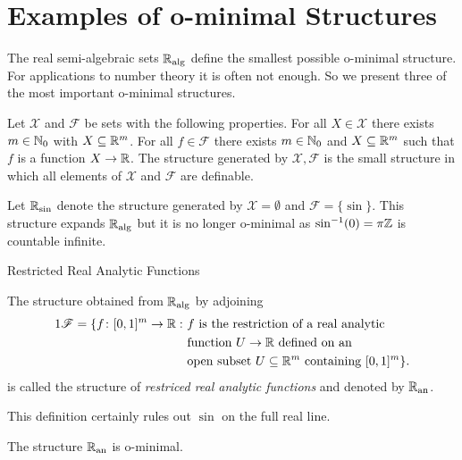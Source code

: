 \documentclass{beamer}
\begin{document}
\section{Examples of o-minimal Structures}

\begin{frame}
  The real semi-algebraic sets ${\mathbb{R}}_{\mathrm{alg}}$ define the smallest possible
  o-minimal structure. For applications to
  number theory it is often not enough. So we present three of the most
  important o-minimal structures.

  \begin{definition}
    Let $\mathscr{X}$ and $\mathscr{F}$ be sets with the following
    properties. For all $X\in \mathscr{X}$ there exists $m\in{\mathbb{N}}_0$ with
    $X\subseteq{\mathbb{R}}^m$. For all $f\in \mathscr{F}$ there exists $m\in{\mathbb{N}}_0$
    and $X\subseteq{\mathbb{R}}^m$ such that $f$ is a function $X\rightarrow{\mathbb{R}}$. The
    \alert{structure generated} by $\mathscr{X},\mathscr{F}$ is the small
    structure in which all elements of $\mathscr{X}$ and $\mathscr{F}$ are
    definable.
  \end{definition}

  \begin{example}
    Let ${\mathbb{R}}_{\sin}$ denote the structure generated by
    $\mathscr{X}=\emptyset$ and $\mathscr{F}=\{\sin \}$.
    This structure expands ${\mathbb{R}}_{\mathrm{alg}}$ but it is no longer o-minimal as
    $\sin^{-1}(0)=\pi{\mathbb{Z}}$ is countable infinite.
  \end{example}
\end{frame}

\begin{frame}{Restricted Real Analytic Functions}

  \begin{definition}
    The structure obtained from ${\mathbb{R}}_{\mathrm{alg}}$ by adjoining
    \begin{alignat*}1
      \mathscr{F} = \{f \colon [0,1]^m\rightarrow\IR:  \,\,&\text{$f$ is the
        restriction of a real analytic}\\&\text{function $U\rightarrow
        \IR$ defined on an}\\
      &\text{open subset
        $U\subset\IR^m$ containing $[0,1]^m$}\}.  
    \end{alignat*}
     is called the structure of \emph{restriced real analytic
       functions}
     and denoted by ${{\mathbb{R}}_{\mathrm{an}}}$.
  \end{definition}

  This definition certainly rules out $\sin$ on the full real line.

  \begin{theorem}[Gabrielov]
    The structure ${{\mathbb{R}}_{\mathrm{an}}}$ is o-minimal. 
  \end{theorem}
\end{frame}
\end{document}
